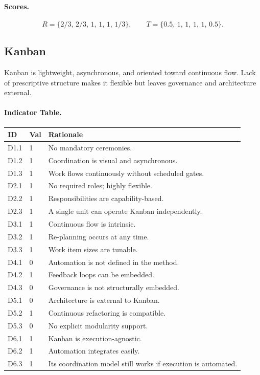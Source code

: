 \documentclass[11pt, a4paper, twocolumn]{article} %
\begin{document}
\paragraph{Scores.}

\[
R = \{2/3,\, 2/3,\, 1,\, 1,\, 1,\, 1/3\},\qquad
T = \{0.5,\, 1,\, 1,\, 1,\, 1,\, 0.5\}.
\]

\newpage
\subsection*{Kanban}

Kanban \citep{anderson2010kanban} is lightweight, asynchronous, and oriented
toward continuous flow. Lack of prescriptive structure makes it flexible but
leaves governance and architecture external.

\paragraph{Indicator Table.}

\begin{table}[h]
\centering
\begin{tabular}{llp{10.5cm}}
\toprule
\textbf{ID} & \textbf{Val} & \textbf{Rationale} \\
\midrule
D1.1 & 1 & No mandatory ceremonies. \\
D1.2 & 1 & Coordination is visual and asynchronous. \\
D1.3 & 1 & Work flows continuously without scheduled gates. \\
\midrule
D2.1 & 1 & No required roles; highly flexible. \\
D2.2 & 1 & Responsibilities are capability-based. \\
D2.3 & 1 & A single unit can operate Kanban independently. \\
\midrule
D3.1 & 1 & Continuous flow is intrinsic. \\
D3.2 & 1 & Re-planning occurs at any time. \\
D3.3 & 1 & Work item sizes are tunable. \\
\midrule
D4.1 & 0 & Automation is not defined in the method. \\
D4.2 & 1 & Feedback loops can be embedded. \\
D4.3 & 0 & Governance is not structurally embedded. \\
\midrule
D5.1 & 0 & Architecture is external to Kanban. \\
D5.2 & 1 & Continuous refactoring is compatible. \\
D5.3 & 0 & No explicit modularity support. \\
\midrule
D6.1 & 1 & Kanban is execution-agnostic. \\
D6.2 & 1 & Automation integrates easily. \\
D6.3 & 1 & Its coordination model still works if execution is automated. \\
\bottomrule
\end{tabular}
\end{table}
\end{document}
